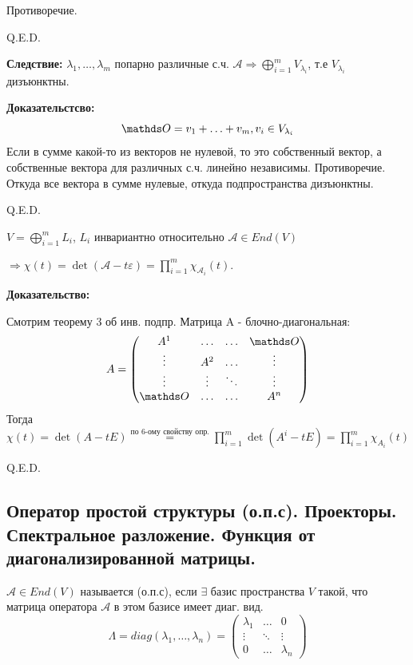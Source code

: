 Противоречие.

\hfill Q.E.D.

\textbf{Следствие:} $\lambda_1, \ldots,\lambda_m$ попарно различные с.ч. $\mathcal{A} \Rightarrow \bigoplus\limits_{i=1}^m V_{\lambda_i}$, т.е $V_{\lambda_i}$ дизъюнктны.

\textbf{Доказательстсво:}
$$\zero = v_1 + \ldots+ v_m, v_i \in V_{\lambda_i}$$
Если в сумме какой-то из векторов не нулевой, то это собственный вектор, а собственные вектора для различных с.ч. линейно независимы. Противоречие. Откуда все вектора в сумме нулевые, откуда подпространства дизъюнктны.

\hfill Q.E.D.


$V = \bigoplus\limits_{i=1}^mL_i$, $L_i$ инвариантно относительно $\mathcal{A} \in End(V)$

$\Rightarrow \chi(t) = \det(\mathcal{A} - t\varepsilon) = \prod\limits_{i=1}^m\chi_{\mathcal{A}_i}(t) $.

\textbf{Доказательство:}

Смотрим теорему 3 об инв. подпр. Матрица A - блочно-диагональная:
$$A = \begin{pmatrix}
    A^1 &\ldots&\ldots& \zero\\
    \vdots &A^2&\ldots& \vdots\\
    \vdots  & \vdots &\ddots& \vdots\\
    \zero & \ldots &\ldots& A^n
\end{pmatrix}$$
  Тогда $\chi(t) = \det(A-tE) \overset{\text{по 6-ому свойству опр.}}= \prod\limits_{i=1}^m \det(A^i-tE) = \prod\limits_{i=1}^m \chi_{A_i}(t) $

\hfill Q.E.D.


\subsection{Оператор простой структуры (о.п.с). Проекторы. Спектральное разложение. Функция от диагонализированной матрицы.}

$\mathcal{A} \in End(V)$ называется  (о.п.с), если $\exists$ базис пространства $V$ такой, что матрица оператора $\mathcal{A}$ в этом базисе имеет диаг. вид.
$$\Lambda = diag(\lambda_1,\ldots,\lambda_n)=\begin{pmatrix}
    \lambda_1 & \ldots & 0 \\
    \vdots & \ddots & \vdots\\
    0 & \ldots &\lambda_n
\end{pmatrix}$$

